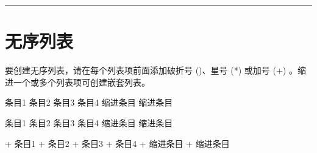 \documentclass[letterpaper,10pt,english]{sphinxmanual}
\begin{document}
\bigskip\hrule\bigskip



\section{无序列表}
\label{\detokenize{other/myst_markdown:id4}}
\sphinxAtStartPar
要创建无序列表，请在每个列表项前面添加破折号 (\sphinxhyphen{})、星号 (*) 或加号 (+) 。缩进一个或多个列表项可创建嵌套列表。

\begin{sphinxVerbatim}[commandchars=\\\{\}]
条目1
条目2
条目3
条目4
缩进条目
缩进条目

条目1
条目2
条目3
条目4
缩进条目
缩进条目

+ 条目1
+ 条目2
+ 条目3
+ 条目4
    + 缩进条目
    + 缩进条目
\end{sphinxVerbatim}
\end{document}
